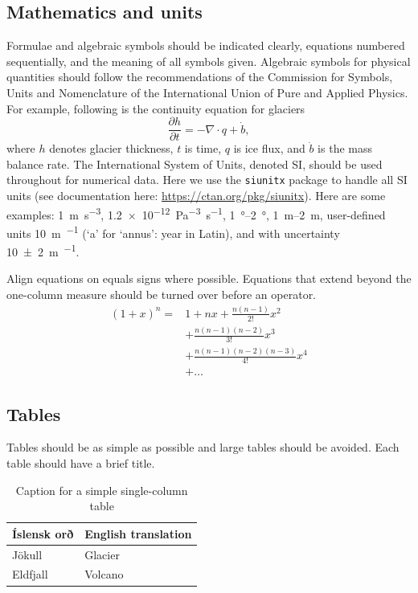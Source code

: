 \documentclass{jokull}
\begin{document}
\subsection{Mathematics and units}

Formulae and algebraic symbols should be indicated clearly, equations numbered sequentially, and the meaning of all symbols given. Algebraic symbols for physical quantities should follow the recommendations of the Commission for Symbols, Units and Nomenclature of the International Union of Pure and Applied Physics. For example, following is the continuity equation for glaciers
\begin{equation}\label{eq:ContinuityEquation}
    \frac{\partial h}{\partial t} = - \nabla \cdot q + \dot{b},
\end{equation}
where $h$ denotes glacier thickness, $t$ is time, $q$ is ice flux, and $\dot{b}$ is the mass balance rate. The International System of Units, denoted SI, should be used throughout for numerical data. Here we use the \verb"siunitx" package to handle all SI units (see documentation here: \url{https://ctan.org/pkg/siunitx}). Here are some examples: \qty{1}{\metre\per\second\cubed}, \qty{1.2e-12}{\pascal^{-3}\second^{-1}}, \qtyrange{1}{2}{\degree}, \qtyrange[range-phrase=--,range-units=single]{1}{2}{\metre}, user-defined units \qty{10}{\metre\per\year} (`a' for `annus': year in Latin), and with uncertainty \qty{10(2)}{\metre\per\year}.

Align equations on equals signs where possible. Equations that extend beyond the one-column measure should be turned over before an operator.
\begin{equation}
\begin{split}
    \left(1+x\right)^n = & 1 + nx + \frac{n\left(n-1\right)}{2!}x^2 \\
    & + \frac{n\left(n-1\right)\left(n-2\right)}{3!}x^3 \\
    & + \frac{n\left(n-1\right)\left(n-2\right)\left(n-3\right)}{4!}x^4 \\
    & + \ldots
\end{split}
\end{equation}

\subsection{Tables}

Tables should be as simple as possible and large tables should be avoided. Each table should have a brief title.
\begin{table}[ht]
    \centering
    \caption{Caption for a simple single-column table}
    \label{tab:table01}
    \begin{tabular}{ll}
        \hline
        Íslensk orð & English translation \\ \hline
        Jökull & Glacier \\
        Eldfjall & Volcano \\ \hline
    \end{tabular}
\end{table}
\end{document}
